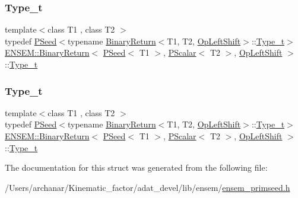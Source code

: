 \subsubsection{\texorpdfstring{Type\_t}{Type\_t}\hspace{0.1cm}{\footnotesize\ttfamily [1/2]}}
{\footnotesize\ttfamily template$<$class T1 , class T2 $>$ \\
typedef \mbox{\hyperlink{classENSEM_1_1PSeed}{P\+Seed}}$<$typename \mbox{\hyperlink{structENSEM_1_1BinaryReturn}{Binary\+Return}}$<$T1, T2, \mbox{\hyperlink{structENSEM_1_1OpLeftShift}{Op\+Left\+Shift}}$>$\+::\mbox{\hyperlink{structENSEM_1_1BinaryReturn_3_01PSeed_3_01T1_01_4_00_01PScalar_3_01T2_01_4_00_01OpLeftShift_01_4_a90ffce4c0c1de6cc5c4ee7ca839e1193}{Type\+\_\+t}}$>$ \mbox{\hyperlink{structENSEM_1_1BinaryReturn}{E\+N\+S\+E\+M\+::\+Binary\+Return}}$<$ \mbox{\hyperlink{classENSEM_1_1PSeed}{P\+Seed}}$<$ T1 $>$, \mbox{\hyperlink{classENSEM_1_1PScalar}{P\+Scalar}}$<$ T2 $>$, \mbox{\hyperlink{structENSEM_1_1OpLeftShift}{Op\+Left\+Shift}} $>$\+::\mbox{\hyperlink{structENSEM_1_1BinaryReturn_3_01PSeed_3_01T1_01_4_00_01PScalar_3_01T2_01_4_00_01OpLeftShift_01_4_a90ffce4c0c1de6cc5c4ee7ca839e1193}{Type\+\_\+t}}}

\mbox{\label{structENSEM_1_1BinaryReturn_3_01PSeed_3_01T1_01_4_00_01PScalar_3_01T2_01_4_00_01OpLeftShift_01_4_a90ffce4c0c1de6cc5c4ee7ca839e1193}} 
\subsubsection{\texorpdfstring{Type\_t}{Type\_t}\hspace{0.1cm}{\footnotesize\ttfamily [2/2]}}
{\footnotesize\ttfamily template$<$class T1 , class T2 $>$ \\
typedef \mbox{\hyperlink{classENSEM_1_1PSeed}{P\+Seed}}$<$typename \mbox{\hyperlink{structENSEM_1_1BinaryReturn}{Binary\+Return}}$<$T1, T2, \mbox{\hyperlink{structENSEM_1_1OpLeftShift}{Op\+Left\+Shift}}$>$\+::\mbox{\hyperlink{structENSEM_1_1BinaryReturn_3_01PSeed_3_01T1_01_4_00_01PScalar_3_01T2_01_4_00_01OpLeftShift_01_4_a90ffce4c0c1de6cc5c4ee7ca839e1193}{Type\+\_\+t}}$>$ \mbox{\hyperlink{structENSEM_1_1BinaryReturn}{E\+N\+S\+E\+M\+::\+Binary\+Return}}$<$ \mbox{\hyperlink{classENSEM_1_1PSeed}{P\+Seed}}$<$ T1 $>$, \mbox{\hyperlink{classENSEM_1_1PScalar}{P\+Scalar}}$<$ T2 $>$, \mbox{\hyperlink{structENSEM_1_1OpLeftShift}{Op\+Left\+Shift}} $>$\+::\mbox{\hyperlink{structENSEM_1_1BinaryReturn_3_01PSeed_3_01T1_01_4_00_01PScalar_3_01T2_01_4_00_01OpLeftShift_01_4_a90ffce4c0c1de6cc5c4ee7ca839e1193}{Type\+\_\+t}}}



The documentation for this struct was generated from the following file\+:\begin{DoxyCompactItemize}
\item 
/\+Users/archanar/\+Kinematic\+\_\+factor/adat\+\_\+devel/lib/ensem/\mbox{\hyperlink{lib_2ensem_2ensem__primseed_8h}{ensem\+\_\+primseed.\+h}}\end{DoxyCompactItemize}
